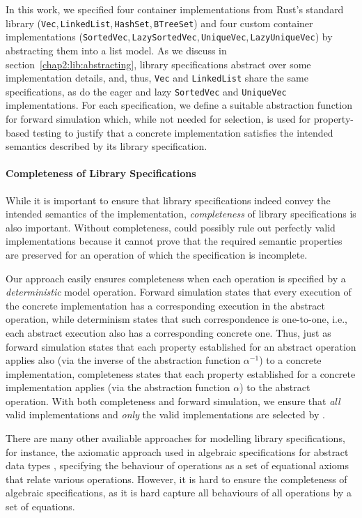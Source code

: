 \noindent In this work, we specified four container implementations from Rust's standard library (\lstinline!Vec!,\,\lstinline!LinkedList!,\,\lstinline!HashSet!,\,\lstinline!BTreeSet!) and four custom container implementations (\lstinline!SortedVec!,\,\lstinline!LazySortedVec!,\,\lstinline!UniqueVec!,\,\lstinline!LazyUniqueVec!) by abstracting them into a list model.
As we discuss in section~\ref{chap2:lib:abstracting}, library specifications abstract over some implementation details, and, thus, \lstinline!Vec! and \lstinline!LinkedList! share the same specifications, as do the eager and lazy \lstinline!SortedVec! and \lstinline!UniqueVec! implementations.
For each specification, we define a suitable abstraction function for forward simulation which, while not needed for selection, is used for property-based testing to justify that a concrete implementation satisfies the intended semantics described by its library specification.

\paragraph*{Completeness of Library Specifications} 
While it is important to ensure that library specifications indeed convey the intended semantics of the implementation, \emph{completeness} of library specifications is also important. Without completeness, \Primrose{} could possibly rule out perfectly valid implementations because it cannot prove that the required semantic properties are preserved for an operation of which the specification is incomplete. 

Our approach easily ensures completeness when each operation is specified by a \emph{deterministic} model operation. Forward simulation states that every execution of the concrete implementation has a corresponding execution in the abstract operation, while determinism states that such correspondence is one-to-one, i.e., each abstract execution also has a corresponding concrete one.
Thus, just as forward simulation states that each property established for an abstract operation applies also (via the inverse of the abstraction function $\alpha^{-1}$) to a concrete implementation, completeness states that each property established for a concrete implementation applies (via the abstraction function $\alpha$) to the abstract operation. With both completeness and forward simulation, we ensure that \emph{all} valid implementations and \emph{only} the valid implementations are selected by \Primrose{}.

There are many other availiable approaches for modelling library specifications, for instance, the axiomatic approach used in algebraic specifications for abstract data types \cite{WIRSING1990675}, specifying the behaviour of operations as a set of equational axioms that relate various operations.
However, it is hard to ensure the completeness of algebraic specifications, as it is hard capture all behaviours of all operations by a set of equations.  

